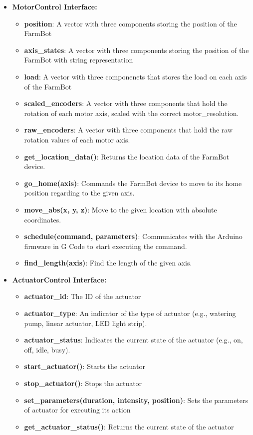 \begin{itemize}
    \item \textbf{MotorControl Interface:} \begin{itemize}
        \item \textbf{position}: A vector with three components storing the position of the FarmBot
        \item \textbf{axis\_states}: A vector with three components storing the position of the FarmBot with string representation
        \item \textbf{load}: A vector with three componenets that stores the load on each axis of the FarmBot
        \item \textbf{scaled\_encoders}: A vector with three components that hold the rotation of each motor axis, scaled with the correct motor\_resolution.
        \item \textbf{raw\_encoders}: A vector with three components that hold the raw rotation values of each motor axis.
        \item \textbf{get\_location\_data()}: Returns the location data of the FarmBot device.
        \item \textbf{go\_home(axis)}: Commands the FarmBot device to move to its home position regarding to the given axis.
        \item \textbf{move\_abs(x, y, z)}: Move to the given location with absolute coordinates.
        \item \textbf{schedule(command, parameters)}: Communicates with the Arduino \newline firmware in G Code to start executing the command.
        \item \textbf{find\_length(axis)}: Find the length of the given axis.
    \end{itemize}

    \item \textbf{ActuatorControl Interface:} \begin{itemize}
        \item \textbf{actuator\_id}: The ID of the actuator
        \item \textbf{actuator\_type}: An indicator of the type of actuator (e.g., watering pump, linear actuator, LED light strip).
        \item \textbf{actuator\_status}: Indicates the current state of the actuator (e.g., on, off, idle, busy).
        \item \textbf{start\_actuator()}: Starts the actuator
        \item \textbf{stop\_actuator()}: Stops the actuator
        \item \textbf{set\_parameters(duration, intensity, position)}: Sets the parameters of actuator for executing its action
        \item \textbf{get\_actuator\_status()}: Returns the current state of the actuator
    \end{itemize}


\end{itemize}
